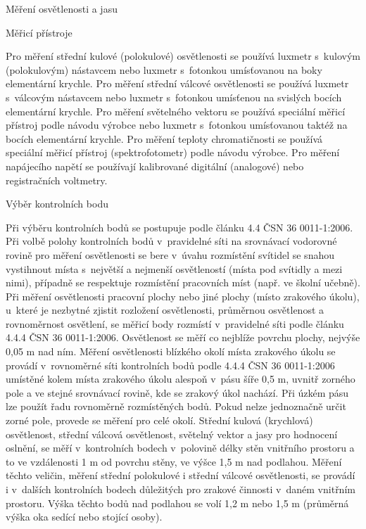 \chap Měření osvětlenosti a jasu

\sec Měřicí přístroje

Pro měření střední kulové (polokulové) osvětlenosti se používá luxmetr s~kulovým (polokulovým) nástavcem nebo luxmetr
s~fotonkou umísťovanou na boky elementární krychle. Pro měření střední válcové osvětlenosti se používá luxmetr
s~válcovým nástavcem nebo luxmetr s~fotonkou umísťenou na svislých bocích elementární krychle.
Pro měření světelného vektoru se používá speciální měřicí přístroj podle návodu výrobce nebo luxmetr s~fotonkou
umísťovanou taktéž na bocích elementární krychle. Pro měření teploty chromatičnosti se používá speciální
měřicí přístroj (spektrofotometr) podle návodu výrobce. Pro měření napájecího napětí se používají kalibrované
digitální (analogové) nebo registračních voltmetry.

\sec Výběr kontrolních bodu

Při výběru kontrolních bodů se postupuje podle článku 4.4 ČSN 36 0011-1:2006. Při volbě polohy kontrolních bodů
v~pravidelné síti na srovnávací vodorovné rovině pro měření osvětlenosti se bere v~úvahu rozmístění svítidel
se snahou vystihnout místa s~největší a nejmenší osvětleností (místa pod svítidly a mezi nimi), případně
se respektuje rozmístění pracovních míst (např. ve školní učebně).
\medskip
Při měření osvětlenosti pracovní plochy nebo jiné plochy (místo zrakového úkolu), u~které je nezbytné zjistit
rozložení osvětlenosti, průměrnou osvětlenost a rovnoměrnost osvětlení, se měřicí body rozmístí v~pravidelné
síti podle článku 4.4.4 ČSN 36 0011-1:2006. Osvětlenost se měří co nejblíže povrchu plochy, nejvýše 0,05 m nad ním.
\medskip
Měření osvětlenosti blízkého okolí místa zrakového úkolu se provádí v~rovnoměrné síti kontrolních bodů
podle 4.4.4 ČSN 36 0011-1:2006 umístěné kolem místa zrakového úkolu alespoň v~pásu šíře 0,5 m, uvnitř
zorného pole a ve stejné srovnávací rovině, kde se zrakový úkol nachází. Při úzkém pásu lze použít
řadu rovnoměrně rozmístěných bodů. Pokud nelze jednoznačně určit zorné pole, provede se měření pro celé okolí.
Střední kulová (krychlová) osvětlenost, střední válcová osvětlenost, světelný vektor a jasy pro hodnocení
oslnění, se měří v~kontrolních bodech v~polovině délky stěn vnitřního prostoru a to ve vzdálenosti 1 m
od povrchu stěny, ve výšce 1,5 m nad podlahou.
\medskip
Měření těchto veličin, měření střední polokulové i střední válcové osvětlenosti, se provádí i v~dalších
kontrolních bodech důležitých pro zrakové činnosti v~daném vnitřním prostoru. Výška těchto bodů nad
podlahou se volí 1,2 m nebo 1,5 m (průměrná výška oka sedící nebo stojící osoby).


